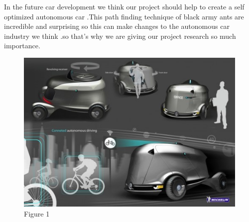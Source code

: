 \documentclass[conference]{IEEEtran}
\begin{document}
In the future car development we think our project should help to create a self optimized  autonomous car .This path finding technique of black army ants are incredible and surprising so this can make changes to the autonomous car industry we think .so that's why we are giving our project research so much importance.\\
\begin{figure}[!h]
\centering
\includegraphics[scale=0.5]{domi.png}
\caption{Figure 1}
\label{fig_sim}
\end{figure}

%
%
\end{document}
